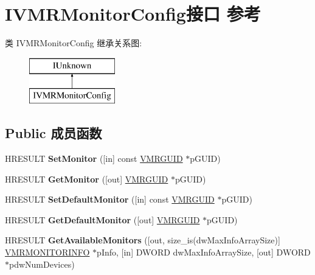 \hypertarget{interface_i_v_m_r_monitor_config}{}\section{I\+V\+M\+R\+Monitor\+Config接口 参考}
\label{interface_i_v_m_r_monitor_config}
类 I\+V\+M\+R\+Monitor\+Config 继承关系图\+:\begin{figure}[H]
\begin{center}
\leavevmode
\includegraphics[height=2.000000cm]{interface_i_v_m_r_monitor_config}
\end{center}
\end{figure}
\subsection*{Public 成员函数}
\begin{DoxyCompactItemize}
\item 
\mbox{\label{interface_i_v_m_r_monitor_config_ac077622980014a02684e99c7b6eceefc}} 
H\+R\+E\+S\+U\+LT {\bfseries Set\+Monitor} (\mbox{[}in\mbox{]} const \hyperlink{structtag_v_m_r_g_u_i_d}{V\+M\+R\+G\+U\+ID} $\ast$p\+G\+U\+ID)
\item 
\mbox{\label{interface_i_v_m_r_monitor_config_af58bde10f797bed1e6bb6a1fb639951f}} 
H\+R\+E\+S\+U\+LT {\bfseries Get\+Monitor} (\mbox{[}out\mbox{]} \hyperlink{structtag_v_m_r_g_u_i_d}{V\+M\+R\+G\+U\+ID} $\ast$p\+G\+U\+ID)
\item 
\mbox{\label{interface_i_v_m_r_monitor_config_a4fc861368cc53e1d124b5a88f10d0dc9}} 
H\+R\+E\+S\+U\+LT {\bfseries Set\+Default\+Monitor} (\mbox{[}in\mbox{]} const \hyperlink{structtag_v_m_r_g_u_i_d}{V\+M\+R\+G\+U\+ID} $\ast$p\+G\+U\+ID)
\item 
\mbox{\label{interface_i_v_m_r_monitor_config_a8ab4e6bc7b4fa39d3671949e9baf81d2}} 
H\+R\+E\+S\+U\+LT {\bfseries Get\+Default\+Monitor} (\mbox{[}out\mbox{]} \hyperlink{structtag_v_m_r_g_u_i_d}{V\+M\+R\+G\+U\+ID} $\ast$p\+G\+U\+ID)
\item 
\mbox{\label{interface_i_v_m_r_monitor_config_aa8c10e050b688798222cd3ba94483be5}} 
H\+R\+E\+S\+U\+LT {\bfseries Get\+Available\+Monitors} (\mbox{[}out, size\+\_\+is(dw\+Max\+Info\+Array\+Size)\mbox{]} \hyperlink{structtag_v_m_r_m_o_n_i_t_o_r_i_n_f_o}{V\+M\+R\+M\+O\+N\+I\+T\+O\+R\+I\+N\+FO} $\ast$p\+Info, \mbox{[}in\mbox{]} D\+W\+O\+RD dw\+Max\+Info\+Array\+Size, \mbox{[}out\mbox{]} D\+W\+O\+RD $\ast$pdw\+Num\+Devices)
\end{DoxyCompactItemize}
